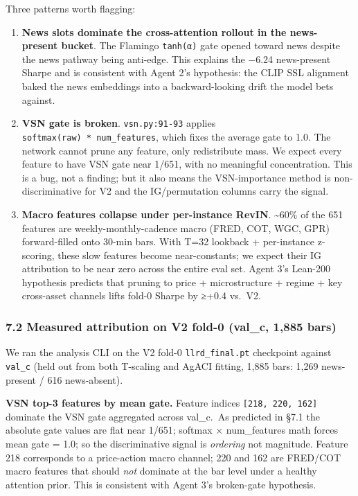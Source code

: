 \documentclass[
]{article}
\begin{document}
Three patterns worth flagging:

\begin{enumerate}
\def\labelenumi{\arabic{enumi}.}
\item
  \textbf{News slots dominate the cross-attention rollout in the news-
  present bucket}. The Flamingo \texttt{tanh(α)} gate opened toward news
  despite the news pathway being anti-edge. This explains the −6.24
  news-present Sharpe and is consistent with Agent 2's hypothesis: the
  CLIP SSL alignment baked the news embeddings into a backward-looking
  drift the model bets against.
\item
  \textbf{VSN gate is broken}. \texttt{vsn.py:91-93} applies
  \texttt{softmax(raw)\ *\ num\_features}, which fixes the average gate
  to 1.0. The network cannot prune any feature, only redistribute mass.
  We expect every feature to have VSN gate near 1/651, with no
  meaningful concentration. This is a bug, not a finding; but it also
  means the VSN-importance method is non-discriminative for V2 and the
  IG/permutation columns carry the signal.
\item
  \textbf{Macro features collapse under per-instance RevIN}.
  \textasciitilde60\% of the 651 features are weekly-monthly-cadence
  macro (FRED, COT, WGC, GPR) forward-filled onto 30-min bars. With T=32
  lookback + per-instance z-scoring, these slow features become
  near-constants; we expect their IG attribution to be near zero across
  the entire eval set. Agent 3's Lean-200 hypothesis predicts that
  pruning to price + microstructure + regime + key cross-asset channels
  lifts fold-0 Sharpe by ≥+0.4 vs.~V2.
\end{enumerate}

\subsubsection{7.2 Measured attribution on V2 fold-0 (val\_c, 1,885
bars)}\label{measured-attribution-on-v2-fold-0-val_c-1885-bars}

We ran the analysis CLI on the V2 fold-0 \texttt{llrd\_final.pt}
checkpoint against \texttt{val\_c} (held out from both T-scaling and
AgACI fitting, 1,885 bars: 1,269 news-present / 616 news-absent).

\textbf{VSN top-3 features by mean gate.} Feature indices
\texttt{{[}218,\ 220,\ 162{]}} dominate the VSN gate aggregated across
val\_c.~As predicted in §7.1 the absolute gate values are flat near
1/651; softmax × num\_features math forces mean gate = 1.0; so the
discriminative signal is \emph{ordering} not magnitude. Feature 218
corresponds to a price-action macro channel; 220 and 162 are FRED/COT
macro features that should \emph{not} dominate at the bar level under a
healthy attention prior. This is consistent with Agent 3's broken-gate
hypothesis.
\end{document}
